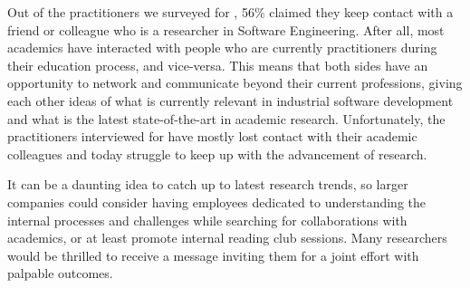 Out of the practitioners we surveyed for , 56\% claimed they keep contact with a friend or colleague who is a researcher in Software Engineering.
After all, most academics have interacted with people who are currently practitioners during their education process, and vice-versa.
This means that both sides have an opportunity to network and communicate beyond their current professions, giving each other ideas of what is currently relevant in industrial software development and what is the latest state-of-the-art in academic research.
Unfortunately, the practitioners interviewed for  have mostly lost contact with their academic colleagues and today struggle to keep up with the advancement of research.

It can be a daunting idea to catch up to latest research trends, so larger companies could consider having employees dedicated to understanding the internal processes and challenges while searching for collaborations with academics, or at least promote internal reading club sessions.
Many researchers would be thrilled to receive a message inviting them for a joint effort with palpable outcomes.